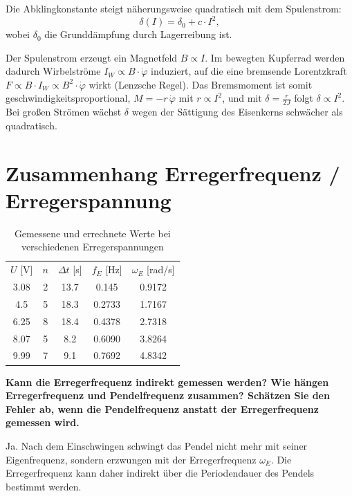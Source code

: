 \documentclass[
  headings=optiontotocandhead,
  twoside,
  openright,
  numbers=noenddot,
  toc=flat,
  11pt,
  parskip=full,
  listof=flat,
  bibliography=totoc,
  a4paper,
  DIV=14,
  BCOR=22mm,
  headheight=5mm,
  headinclude=true,
]{scrartcl}
\begin{document}
Die Abklingkonstante steigt näherungsweise quadratisch mit dem Spulenstrom:
$$ \delta(I) = \delta_0 + c \cdot I^2, $$
wobei $\delta_0$ die Grunddämpfung durch Lagerreibung ist.

Der Spulenstrom erzeugt ein Magnetfeld $B \propto I$. Im bewegten Kupferrad werden dadurch Wirbelströme $I_W \propto B \cdot \dot\varphi$ induziert, auf die eine bremsende Lorentzkraft $F \propto B \cdot I_W \propto B^2 \cdot \dot\varphi$ wirkt (Lenzsche Regel). Das Bremsmoment ist somit geschwindigkeitsproportional, $M = -r\,\dot\varphi$ mit $r \propto I^2$, und mit $\delta = \frac{r}{2J}$ folgt $\delta \propto I^2$. Bei großen Strömen wächst $\delta$ wegen der Sättigung des Eisenkerns schwächer als quadratisch.

\section{Zusammenhang Erregerfrequenz / Erregerspannung}

\begin{table}[H]
  \centering
  \setlength{\tabcolsep}{10pt}
  \begin{tabular}{ |c|c|c|c|c| }
    \multicolumn{1}{c}{$U$ [V]} & \multicolumn{1}{c}{$n$} & \multicolumn{1}{c}{$\Delta t$ [s]} & \multicolumn{1}{c}{$f_E$ [Hz]} & \multicolumn{1}{c}{$\omega_E$ [rad/s]} \\
    3.08 & 2 & 13.7 & 0.145 & 0.9172 \\
    4.5 & 5 & 18.3 & 0.2733 & 1.7167 \\
    6.25 & 8 & 18.4 & 0.4378 & 2.7318 \\
    8.07 & 5 & 8.2 & 0.6090 & 3.8264 \\
    9.99 & 7 & 9.1 & 0.7692 & 4.8342 \\
  \end{tabular}
        \caption{Gemessene und errechnete Werte bei verschiedenen Erregerspannungen}
  \label{tab:erreger_messung}
\end{table}

\textbf{Kann die Erregerfrequenz indirekt gemessen werden? Wie hängen Erregerfrequenz und Pendelfrequenz zusammen? Schätzen Sie den Fehler ab, wenn die Pendelfrequenz anstatt der Erregerfrequenz gemessen wird.}

Ja. Nach dem Einschwingen schwingt das Pendel nicht mehr mit seiner Eigenfrequenz, sondern erzwungen mit der Erregerfrequenz $\omega_E$. Die Erregerfrequenz kann daher indirekt über die Periodendauer des Pendels bestimmt werden.
\end{document}
